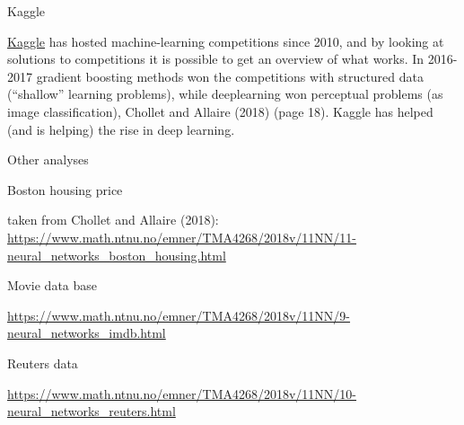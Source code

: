 \documentclass[10pt,ignorenonframetext,]{beamer}
\newenvironment{Shaded}{\begin{snugshade}}{\end{snugshade}}
\newcommand{\DecValTok}[1]{\textcolor[rgb]{0.00,0.00,0.81}{#1}}
\newcommand{\ErrorTok}[1]{\textcolor[rgb]{0.64,0.00,0.00}{\textbf{#1}}}
\newcommand{\FloatTok}[1]{\textcolor[rgb]{0.00,0.00,0.81}{#1}}
\newcommand{\NormalTok}[1]{#1}
\newcommand{\OperatorTok}[1]{\textcolor[rgb]{0.81,0.36,0.00}{\textbf{#1}}}
\newcommand{\StringTok}[1]{\textcolor[rgb]{0.31,0.60,0.02}{#1}}
\begin{document}
\begin{frame}[fragile]
\begin{Shaded}
\end{Shaded}

\end{frame}

\begin{frame}

\begin{block}{Kaggle}

\href{https://www.kaggle.com/}{Kaggle} has hosted machine-learning
competitions since 2010, and by looking at solutions to competitions it
is possible to get an overview of what works. In 2016-2017 gradient
boosting methods won the competitions with structured data (``shallow''
learning problems), while deeplearning won perceptual problems (as image
classification), Chollet and Allaire (2018) (page 18). Kaggle has helped
(and is helping) the rise in deep learning.

\end{block}

\end{frame}

\begin{frame}

\begin{block}{Other analyses}

\begin{block}{Boston housing price}

taken from Chollet and Allaire (2018):
\url{https://www.math.ntnu.no/emner/TMA4268/2018v/11NN/11-neural_networks_boston_housing.html}

\end{block}

\begin{block}{Movie data base}

\url{https://www.math.ntnu.no/emner/TMA4268/2018v/11NN/9-neural_networks_imdb.html}

\end{block}

\begin{block}{Reuters data}

\url{https://www.math.ntnu.no/emner/TMA4268/2018v/11NN/10-neural_networks_reuters.html}

\end{block}

\end{block}

\end{frame}
\end{document}
